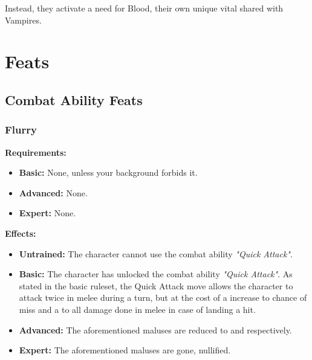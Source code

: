 \documentclass[openany,10pt,a4paper]{book}
\begin{document}
 Instead, they activate a need for Blood, their own unique vital shared with Vampires.\newpage
\chapter{Feats}
\section{Combat Ability Feats}
\subsection{Flurry}
\textbf{Requirements:}
\begin{itemize}
	\item \textbf{Basic:} None, unless your background forbids it.
	\item \textbf{Advanced:} None.
	\item \textbf{Expert:} None.
\end{itemize}
\textbf{Effects:}
\begin{itemize}
	\item \textbf{Untrained:} The character cannot use the combat ability \textit{"Quick Attack"}.
	\item \textbf{Basic:} The character has unlocked the combat ability \textit{"Quick Attack"}. As stated in the basic ruleset, the Quick Attack move allows the character to attack twice in melee during a turn, but at the cost of a  increase to chance of miss and a  to all damage done in melee in case of landing a hit.
	\item \textbf{Advanced:} The aforementioned maluses are reduced to  and  respectively.
	\item \textbf{Expert:} The aforementioned maluses are gone, nullified.
\end{itemize}\newpage
\end{document}
